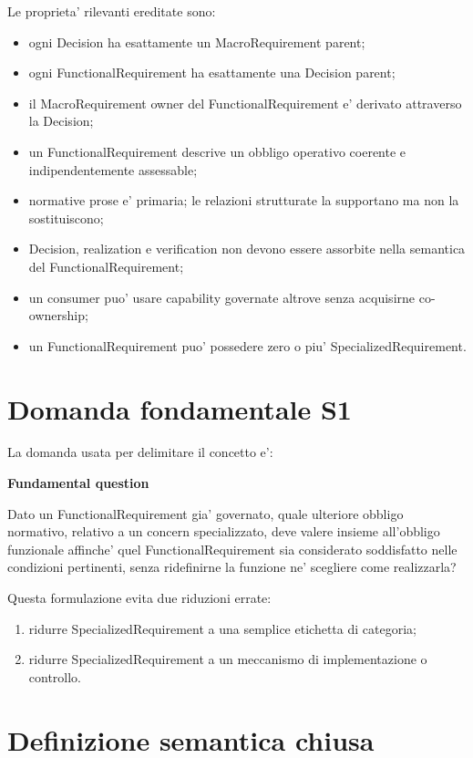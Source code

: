 \documentclass[11pt,a4paper]{article}
\newenvironment{statusbox}[1]{%
  \def\FrameCommand{\fcolorbox{ddtablue}{ddtagray}}%
  \MakeFramed{\advance\hsize-2\width\FrameRestore}
  \noindent\textbf{#1}\par\smallskip
}{\endMakeFramed}
\begin{document}
Le proprieta' rilevanti ereditate sono:
\begin{itemize}
  \item ogni Decision ha esattamente un MacroRequirement parent;
  \item ogni FunctionalRequirement ha esattamente una Decision parent;
  \item il MacroRequirement owner del FunctionalRequirement e' derivato attraverso la Decision;
  \item un FunctionalRequirement descrive un obbligo operativo coerente e indipendentemente assessable;
  \item normative prose e' primaria; le relazioni strutturate la supportano ma non la sostituiscono;
  \item Decision, realization e verification non devono essere assorbite nella semantica del FunctionalRequirement;
  \item un consumer puo' usare capability governate altrove senza acquisirne co-ownership;
  \item un FunctionalRequirement puo' possedere zero o piu' SpecializedRequirement.
\end{itemize}

\section{Domanda fondamentale S1}

La domanda usata per delimitare il concetto e':

\begin{statusbox}{Fundamental question}
Dato un FunctionalRequirement gia' governato, quale ulteriore obbligo normativo, relativo a un concern specializzato, deve valere insieme all'obbligo funzionale affinche' quel FunctionalRequirement sia considerato soddisfatto nelle condizioni pertinenti, senza ridefinirne la funzione ne' scegliere come realizzarla?
\end{statusbox}

Questa formulazione evita due riduzioni errate:
\begin{enumerate}
  \item ridurre SpecializedRequirement a una semplice etichetta di categoria;
  \item ridurre SpecializedRequirement a un meccanismo di implementazione o controllo.
\end{enumerate}

\section{Definizione semantica chiusa}
\end{document}
